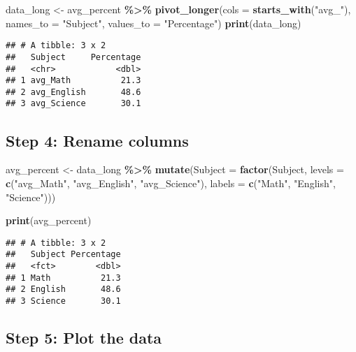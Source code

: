 \documentclass[
]{article}
\newenvironment{Shaded}{\begin{snugshade}}{\end{snugshade}}
\newcommand{\AttributeTok}[1]{\textcolor[rgb]{0.13,0.29,0.53}{#1}}
\newcommand{\FunctionTok}[1]{\textcolor[rgb]{0.13,0.29,0.53}{\textbf{#1}}}
\newcommand{\NormalTok}[1]{#1}
\newcommand{\OtherTok}[1]{\textcolor[rgb]{0.56,0.35,0.01}{#1}}
\newcommand{\SpecialCharTok}[1]{\textcolor[rgb]{0.81,0.36,0.00}{\textbf{#1}}}
\newcommand{\StringTok}[1]{\textcolor[rgb]{0.31,0.60,0.02}{#1}}
\begin{document}
\begin{Shaded}
\begin{Highlighting}[]
\NormalTok{data\_long }\OtherTok{\textless{}{-}}\NormalTok{ avg\_percent }\SpecialCharTok{\%\textgreater{}\%}
  \FunctionTok{pivot\_longer}\NormalTok{(}\AttributeTok{cols =} \FunctionTok{starts\_with}\NormalTok{(}\StringTok{"avg\_"}\NormalTok{),}
               \AttributeTok{names\_to =} \StringTok{"Subject"}\NormalTok{,}
               \AttributeTok{values\_to =} \StringTok{"Percentage"}\NormalTok{) }
\FunctionTok{print}\NormalTok{(data\_long)}
\end{Highlighting}
\end{Shaded}

\begin{verbatim}
## # A tibble: 3 x 2
##   Subject     Percentage
##   <chr>            <dbl>
## 1 avg_Math          21.3
## 2 avg_English       48.6
## 3 avg_Science       30.1
\end{verbatim}

\hypertarget{step-4-rename-columns}{%
\subsection{Step 4: Rename columns}\label{step-4-rename-columns}}

\begin{Shaded}
\begin{Highlighting}[]
\NormalTok{avg\_percent }\OtherTok{\textless{}{-}}\NormalTok{ data\_long }\SpecialCharTok{\%\textgreater{}\%}
  \FunctionTok{mutate}\NormalTok{(}\AttributeTok{Subject =} \FunctionTok{factor}\NormalTok{(Subject, }\AttributeTok{levels =} \FunctionTok{c}\NormalTok{(}\StringTok{"avg\_Math"}\NormalTok{, }\StringTok{"avg\_English"}\NormalTok{, }\StringTok{"avg\_Science"}\NormalTok{),}
                          \AttributeTok{labels =} \FunctionTok{c}\NormalTok{(}\StringTok{"Math"}\NormalTok{, }\StringTok{"English"}\NormalTok{, }\StringTok{"Science"}\NormalTok{)))}

\FunctionTok{print}\NormalTok{(avg\_percent)}
\end{Highlighting}
\end{Shaded}

\begin{verbatim}
## # A tibble: 3 x 2
##   Subject Percentage
##   <fct>        <dbl>
## 1 Math          21.3
## 2 English       48.6
## 3 Science       30.1
\end{verbatim}

\hypertarget{step-5-plot-the-data}{%
\subsection{Step 5: Plot the data}\label{step-5-plot-the-data}}
\end{document}
